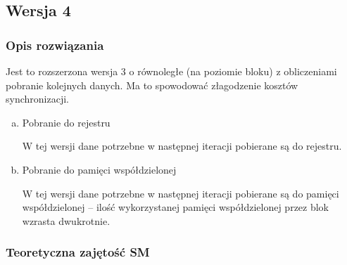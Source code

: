 \subsection{Wersja 4}

\subsubsection{Opis rozwiązania}

Jest to rozszerzona wersja 3 o równoległe (na poziomie bloku) z obliczeniami pobranie kolejnych danych. Ma to spowodować złagodzenie kosztów synchronizacji.

\begin{enumerate}[(a)]

\item Pobranie do rejestru

W tej wersji dane potrzebne w następnej iteracji pobierane są do rejestru.



\item Pobranie do pamięci współdzielonej

W tej wersji dane potrzebne w następnej iteracji pobierane są do pamięci współdzielonej -- ilość wykorzystanej pamięci współdzielonej przez blok wzrasta dwukrotnie.



\end{enumerate}

\subsubsection{Teoretyczna zajętość SM}

